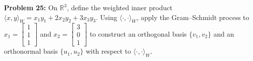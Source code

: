 \documentclass[11pt, letterpaper]{article}
\theoremstyle{definition}
\theoremstyle{remark}
\begin{document}
\vspace{0.8em}

\textbf{Problem 25:} On $\mathbb{R}^3$, define the weighted inner product $\langle x, y \rangle_W = x_1 y_1 + 2 x_2 y_2 + 3 x_3 y_3$. Using $\langle \cdot, \cdot \rangle_W$, apply the Gram--Schmidt process to $x_1 = \begin{bmatrix} 1 \\ 1 \\ 1 \end{bmatrix}$ and $x_2 = \begin{bmatrix} 3 \\ 0 \\ 1 \end{bmatrix}$ to construct an orthogonal basis $\{v_1, v_2\}$ and an orthonormal basis $\{u_1, u_2\}$ with respect to $\langle \cdot, \cdot \rangle_W$.
\end{document}
